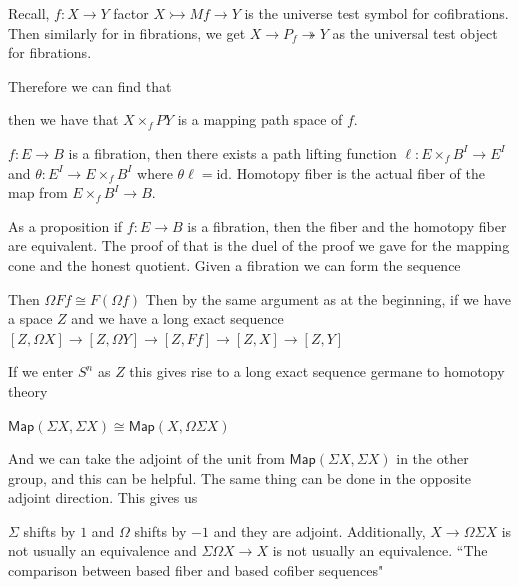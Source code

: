 \documentclass[10pt]{article}
\theoremstyle{definition}
\begin{document}
Recall, $f:X\to Y$ factor $X\rightarrowtail Mf\to Y$ is the universe test symbol for cofibrations. Then similarly for in fibrations, we get $X\to P_f\twoheadrightarrow Y$ as the universal test object for fibrations. 

Therefore we can find that 
\begin{center}
	then we have that $X\times_fPY$ is a mapping path space of $f$. 
\end{center}
$f:E\to B$ is a fibration, then there exists a path lifting function $\ell:E\times _f B^I\to E^I$ and $\theta:E^I\to E\times_f B^I$  where $\theta\ell = \text{id}$. Homotopy fiber is the actual fiber of the map from $E\times_f B^I\to B$. 

As a proposition if $f:E\to B$ is a fibration, then the fiber and the homotopy fiber are equivalent. The proof of that is the duel of the proof we gave for the mapping cone and the honest quotient. Given a fibration we can form the sequence \begin{center}
\end{center}
Then $\Omega Ff\cong F(\Omega f)$
Then by the same argument as at the beginning, if we have a space $Z$ and we have a long exact sequence 
$[Z,\Omega X]\to [Z,\Omega Y]\to [Z,Ff]\to  [Z,X]\to [Z,Y]$

If we enter $S^n$ as $Z$ this gives rise to a long exact sequence germane to homotopy theory


$\mathsf{Map}(\Sigma X,\Sigma X)\cong \mathsf{Map}(X,\Omega\Sigma X)$

And we can take the adjoint of the unit from $\mathsf{Map}(\Sigma X,\Sigma X)$ in the other group, and this can be helpful. The same thing can be done in the opposite adjoint direction. This gives us

\begin{center}
\end{center}
$\Sigma$ shifts by $1$ and $\Omega$ shifts by $-1$ and they are adjoint. Additionally, $X\to \Omega\Sigma X$ is not usually an equivalence and $\Sigma\Omega X\to X$ is not usually an equivalence. ``The comparison between based fiber and based cofiber sequences"
\end{document}
